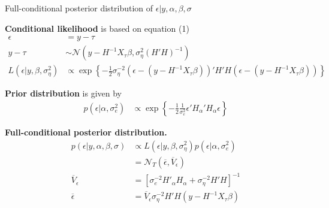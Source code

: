 \documentclass[notes,blackandwhite,mathsans,usenames,dvipsnames]{beamer}
\begin{document}
\begin{frame}{Full-conditional posterior distribution of $\epsilon|y,\alpha,\beta,\sigma$}

\small
\bigskip\textbf{Conditional likelihood} {\color{mcxs2}is based on equation} (1)
\begin{align*}
\epsilon &=y -\tau\\
y-\tau  &\sim\mathcal{N}\left(y-H^{-1} X_\tau \beta, \sigma^2_\eta (H'H)^{-1}\right)\\
L\left(\epsilon|y,\beta,\sigma^2_\eta\right)&\propto\exp\left\{-\frac{1}{2}\sigma^{-2}_\eta\left(\epsilon-(y-H^{-1}X_\tau \beta)\right)'H'H\left(\epsilon-(y-H^{-1}X_\tau \beta)\right)  \right\}
\end{align*}

\smallskip\textbf{Prior distribution} {\color{mcxs2}is given by}
\begin{align*}
p\left(\epsilon|\alpha,\sigma^2_e\right) &\propto \exp\left\{-\frac{1}{2}\frac{1}{\sigma^2_e} \epsilon'H_{\alpha}'H_{\alpha}\epsilon \right\}
\end{align*}


\smallskip\textbf{Full-conditional posterior distribution.}
\begin{align*}
p\left( \epsilon|y,\alpha,\beta,\sigma \right)&\propto L\left(\epsilon|y,\beta,\sigma^2_\eta\right)p\left(\epsilon|\alpha,\sigma^2_e\right)\\
&= \mathcal{N}_T\left(\overline{\epsilon},\overline{V}_\epsilon\right)\\
\overline{V}_\epsilon &= \left[\sigma^{-2} _eH'_\alpha H_\alpha + \sigma^{-2} _\eta H' H \right]^{-1}\\
\overline{\epsilon} &= \overline{V}_\epsilon \sigma^{-2} _\eta H'H\left(y- H^{-1}X_\tau \beta \right)
\end{align*}

\end{frame}
\end{document}
